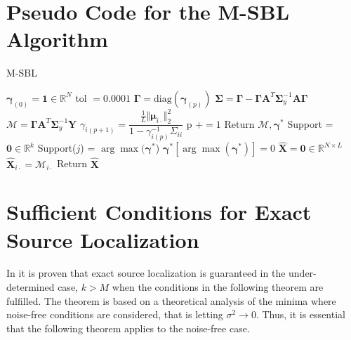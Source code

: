 

\section{Pseudo Code for the M-SBL Algorithm}
\begin{algorithm}[H]
\caption{M-SBL}
\begin{algorithmic}[1]
\State $\boldsymbol{\gamma}_{(0)} = \mathbf{1} \in \mathbb{R}^N$
\State tol $=0.0001$
	\State $\boldsymbol{\Gamma} = \text{diag}(\boldsymbol{\gamma}_{(p)})$
	\State $\boldsymbol{\Sigma} = \boldsymbol{\Gamma} - \boldsymbol{\Gamma} \mathbf{A}^T \boldsymbol{\Sigma}_y^{-1} \mathbf{A} \boldsymbol{\Gamma}$
	\State $\mathcal{M} = \boldsymbol{\Gamma} \mathbf{A}^T \boldsymbol{\Sigma}_y^{-1} \mathbf{Y}$
		\State $\gamma_{i(p+1)} = \dfrac{\frac{1}{L} \Vert \boldsymbol{\mu}_{i \cdot} \Vert_2^2}{1 - \gamma_{i(p)}^{-1} \Sigma_{ii}}$
	\EndFor
	\State p $+= 1$
\EndWhile
\State Return $\mathcal{M}, \boldsymbol{\gamma}^{\ast}$
\EndProcedure
{}
\State Support = $\mathbf{0} \in \mathbb{R}^{k}$
		\State Support($j$) = $\arg \max (\boldsymbol{\gamma}^{\ast}$)
		\State $\boldsymbol{\gamma}^{\ast}\left[ \arg \max (\boldsymbol{\gamma}^{\ast})\right] = 0$
	\EndIf
\EndFor
\State $\hat{\mathbf{X}} = \mathbf{0} \in \mathbb{R}^{N \times L}$
	\State $\hat{\mathbf{X}}_{i\cdot} = \mathcal{M}_{i\cdot}$
\EndFor
\State Return $\hat{\mathbf{X}}$
\EndProcedure
\end{algorithmic}
\end{algorithm}

\section{Sufficient Conditions for Exact Source Localization}
In \cite{Balkan2014} it is proven that exact source localization is guaranteed in the under-determined case, $k > M$ when the conditions in the following theorem are fulfilled.
The theorem is based on a theoretical analysis of the minima where noise-free conditions are considered, that is letting $\sigma^2 \rightarrow 0$. 
Thus, it is essential that the following theorem applies to the noise-free case. 

